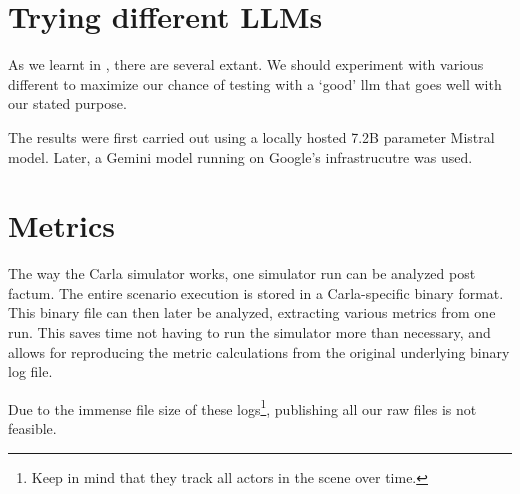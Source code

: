 \section{Trying different LLMs}

As we learnt in , there are several  extant. We should
experiment with various different  to maximize our chance of testing with a `good'
\acrshort{llm} that goes well with our stated purpose.

The results were first carried out using a locally hosted \num{7.2}B parameter
Mistral model. Later, a Gemini model running on Google's infrastrucutre was used.

\section{Metrics}

The way the Carla simulator works, one simulator run can be analyzed post factum. The entire
scenario execution is stored in a Carla-specific binary format. This binary file can then later be
analyzed, extracting various metrics from one run. This saves time not having to run the simulator
more than necessary, and allows for reproducing the metric calculations from the original underlying
binary log file.

Due to the immense file size of these logs\footnote{Keep in mind that they track all actors in the
    scene over time.}, publishing all our raw files is not feasible.
